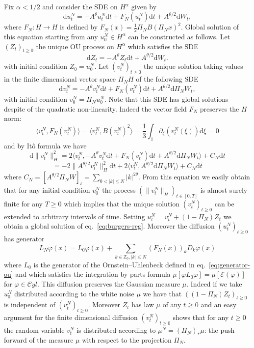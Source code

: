 \documentclass[11pt,a4paper,reqno]{amsart}
\newcommand{\TT}{\mathbb{T}}
\newcommand{\ZZ}{\mathbb{Z}}
\newcommand{\cE}{\mathcal{E}}
\newcommand{\dd}{\mathrm{d}}
\newcommand{\cyl}{\mathcal{C}yl}
\begin{document}
Fix $\alpha < 1/2$ and consider the SDE on $H^\alpha$ given by
\begin{equation}
\label{eq:burgers-reg}
\dd u^N_t = - A^\theta u^N_t  \dd t + F_N(u^N_t)\dd t + A^{\theta/2} \dd W_t,
\end{equation}
where  $F_N : H\to H$ is defined by $F_N(x) = \frac12  \Pi_N B (\Pi_N x)^2$. Global solution of this equation starting from any $u_0^N\in H^\alpha$  can be constructed as follows.  Let $(Z_t)_{t\ge 0}$ the unique OU process on $H^\alpha$ which satisfies the SDE
\begin{equation}
\label{eq:ou}
\dd Z_t = - A^\theta Z_t  \dd t + A^{\theta/2} \dd W_t.
\end{equation}
with initial condition $Z_0 = u^N_0$. Let $(v^N_t)_{t\ge 0}$ the unique solution taking values in the finite dimensional vector space $\Pi_N H$ of the following SDE
$$
\dd v^N_t = - A^\theta v^N_t  \dd t + F_N(v^N_t)\dd t + A^{\theta/2}\dd  \Pi_N  W_t,
$$
with initial condition $v^N_0 = \Pi_N u^N_0$. Note that this SDE has global solutions despite of the quadratic non-linearity. Indeed the vector field $F_N$ preserves the $H$ norm: 
$$
\langle v^N_t,F_N(v^N_t)\rangle = \langle v^N_t,B (v^N_t)^2\rangle = \frac13 \int_\TT \partial_\xi(v^N_t(\xi))\dd \xi = 0 
$$
and by It\^o formula we have
$$
\dd \|v^N_t\|_H^2 = 2 \langle v^N_t,- A^\theta v^N_t  \dd t + F_N(v^N_t)\dd t + A^{\theta/2}\dd  \Pi_N  W_t \rangle + C_N \dd t
$$
$$
  = -2  \|A^{\theta/2} v^N_t\|^2_H \dd t + 2 \langle v^N_t, A^{\theta/2}\dd  \Pi_N  W_t \rangle + C_N \dd t
$$
where $C_N = [A^{\theta/2}\Pi_N W]_t = \sum_{0<|k|\le N} |k|^{2\theta}$. From this equation we easily obtain that for any  initial condition $v^N_0$ the process $(\|v^N_t\|_H)_{t\in[0,T]}$ is almost surely finite for any $T \ge 0$ which implies that the unique solution $(v^N_t)_{t \ge 0}$ can be extended to arbitrary intervals of time. Setting $u^N_t = v^N_t + (1-\Pi_N)Z_t$ we obtain a global solution of eq.~\eqref{eq:burgers-reg}. Moreover the diffusion $(u^N_t)_{t\ge 0}$ has  generator
$$
L_N \varphi(x) = L_0\varphi(x)+  \sum_{k\in\ZZ_0, |k|\le N} (F_N(x))_k D_k \varphi(x)
$$
where $L_0$ 
is the generator of the Ornstein--Uhlenbeck defined in eq.~\eqref{eq:generator-ou} and which satisfies the integration by parts formula
$
\mu [\varphi L_0 \varphi] = \mu[ \cE(\varphi)]
$ for $\varphi\in\cyl$.
This diffusion preserves the Gaussian measure $\mu$. Indeed if we take $u_0^N$ distributed according to the white noise $\mu$ we have that $((1-\Pi_N)Z_t)_{t \ge 0}$ is independent of $(v^N_t)_{t\ge 0}$. Moreover $Z_t$ has law $\mu$ of any $t\ge 0$ and an easy argument for the finite dimensional diffusion $(v^N_t)_{t\ge 0}$ shows that for any $t\ge0$ the random variable $v^N_t$ is distributed according to $\mu^N = (\Pi_N)_* \mu$: the push forward of the measure $\mu$ with respect to the projection $\Pi_N$.
\end{document}
